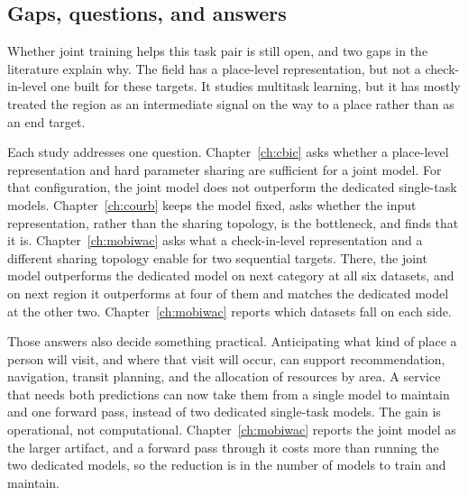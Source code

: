 \subsection{Gaps, questions, and answers}

Whether joint training helps this task pair is still open, and two gaps in the
literature explain why. The field has a place-level representation, but not a
check-in-level one built for these targets. It studies multitask learning, but it has
mostly treated the region as an intermediate signal on the way to a place rather than
as an end target.

Each study addresses one question. Chapter~\ref{ch:cbic} asks whether a
place-level representation and hard parameter sharing are sufficient for a joint
model. For that configuration, the joint model does not outperform the dedicated
single-task models. Chapter~\ref{ch:courb} keeps the model fixed, asks whether the
input representation, rather than the sharing topology, is the bottleneck, and finds
that it is. Chapter~\ref{ch:mobiwac} asks what a check-in-level representation and a
different sharing topology enable for two sequential targets. There, the joint model
outperforms the dedicated model on next category at all six datasets, and on next
region it outperforms at four of them and matches the dedicated model at the other
two. Chapter~\ref{ch:mobiwac} reports which datasets fall on each side.

Those answers also decide something practical. Anticipating what kind of place a
person will visit, and where that visit will occur, can support recommendation,
navigation, transit planning, and the allocation of resources by area. A service that
needs both predictions can now take them from a single model to maintain and one
forward pass, instead of two dedicated single-task models. The gain is operational,
not computational. Chapter~\ref{ch:mobiwac} reports the joint model as the larger
artifact, and a forward pass through it costs more than running the two dedicated
models, so the reduction is in the number of models to train and maintain.
